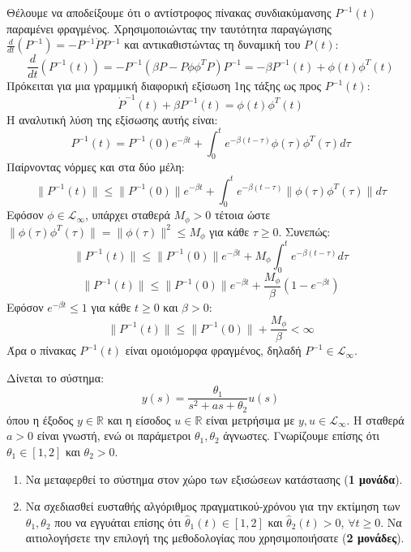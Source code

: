 \documentclass[a4paper,11pt]{article}
\begin{document}
\begin{answer}
Θέλουμε να αποδείξουμε ότι ο αντίστροφος πίνακας συνδιακύμανσης $P^{-1}(t)$ παραμένει φραγμένος.
Χρησιμοποιώντας την ταυτότητα παραγώγισης $\frac{d}{dt}(P^{-1}) = -P^{-1} \dot{P} P^{-1}$ και αντικαθιστώντας τη δυναμική του $P(t)$:
\[ \frac{d}{dt}(P^{-1}(t)) = -P^{-1} \left( \beta P - P \phi \phi^T P \right) P^{-1} = -\beta P^{-1}(t) + \phi(t) \phi^T(t) \]
Πρόκειται για μια γραμμική διαφορική εξίσωση 1ης τάξης ως προς $P^{-1}(t)$:
\[ \dot{P}^{-1}(t) + \beta P^{-1}(t) = \phi(t) \phi^T(t) \]
Η αναλυτική λύση της εξίσωσης αυτής είναι:
\[ P^{-1}(t) = P^{-1}(0) e^{-\beta t} + \int_0^t e^{-\beta(t-\tau)} \phi(\tau) \phi^T(\tau) d\tau \]
Παίρνοντας νόρμες και στα δύο μέλη:
\[ \|P^{-1}(t)\| \le \|P^{-1}(0)\| e^{-\beta t} + \int_0^t e^{-\beta(t-\tau)} \|\phi(\tau) \phi^T(\tau)\| d\tau \]
Εφόσον $\phi \in \mathcal{L}_\infty$, υπάρχει σταθερά $M_\phi > 0$ τέτοια ώστε $\|\phi(\tau) \phi^T(\tau)\| = \|\phi(\tau)\|^2 \le M_\phi$ για κάθε $\tau \ge 0$. Συνεπώς:
\[ \|P^{-1}(t)\| \le \|P^{-1}(0)\| e^{-\beta t} + M_\phi \int_0^t e^{-\beta(t-\tau)} d\tau \]
\[ \|P^{-1}(t)\| \le \|P^{-1}(0)\| e^{-\beta t} + \frac{M_\phi}{\beta} \left( 1 - e^{-\beta t} \right) \]
Εφόσον $e^{-\beta t} \le 1$ για κάθε $t \ge 0$ και $\beta > 0$:
\[ \|P^{-1}(t)\| \le \|P^{-1}(0)\| + \frac{M_\phi}{\beta} < \infty \]
Άρα ο πίνακας $P^{-1}(t)$ είναι ομοιόμορφα φραγμένος, δηλαδή $P^{-1} \in \mathcal{L}_\infty$.
\end{answer}

\begin{question}
Δίνεται το σύστημα:
\begin{equation}
    y(s) = \frac{\theta_1}{s^2 + a s + \theta_2} u(s)
\end{equation}
όπου η έξοδος $y \in \mathbb{R}$ και η είσοδος $u \in \mathbb{R}$ είναι μετρήσιμα με $y, u \in \mathcal{L}_\infty$. Η σταθερά $a > 0$ είναι γνωστή, ενώ οι παράμετροι $\theta_1, \theta_2$ άγνωστες. Γνωρίζουμε επίσης ότι $\theta_1 \in [1,2]$ και $\theta_2 > 0$.

\begin{enumerate}[label=\roman*)]
    \item Να μεταφερθεί το σύστημα στον χώρο των εξισώσεων κατάστασης (\textbf{1 μονάδα}).
    \item Να σχεδιασθεί ευσταθής αλγόριθμος πραγματικού-χρόνου για την εκτίμηση των $\theta_1, \theta_2$ που να εγγυάται επίσης ότι $\hat{\theta}_1(t) \in [1,2]$ και $\hat{\theta}_2(t) > 0$, $\forall t \ge 0$. Να αιτιολογήσετε την επιλογή της μεθοδολογίας που χρησιμοποιήσατε (\textbf{2 μονάδες}).
\end{enumerate}
\end{question}
\end{document}
